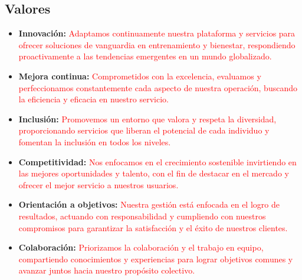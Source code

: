 \subsection{Valores}

\begin{itemize}
    \item \textbf{Innovación:} \textcolor{red}{Adaptamos continuamente nuestra plataforma y servicios para ofrecer soluciones de vanguardia en entrenamiento y bienestar, respondiendo proactivamente a las tendencias emergentes en un mundo globalizado.}
    \item \textbf{Mejora continua:} \textcolor{red}{Comprometidos con la excelencia, evaluamos y perfeccionamos constantemente cada aspecto de nuestra operación, buscando la eficiencia y eficacia en nuestro servicio.}
    \item \textbf{Inclusión:} \textcolor{red}{Promovemos un entorno que valora y respeta la diversidad, proporcionando servicios que liberan el potencial de cada individuo y fomentan la inclusión en todos los niveles.}
    \item \textbf{Competitividad:} \textcolor{red}{Nos enfocamos en el crecimiento sostenible invirtiendo en las mejores oportunidades y talento, con el fin de destacar en el mercado y ofrecer el mejor servicio a nuestros usuarios.}
    \item \textbf{Orientación a objetivos:} \textcolor{red}{Nuestra gestión está enfocada en el logro de resultados, actuando con responsabilidad y cumpliendo con nuestros compromisos para garantizar la satisfacción y el éxito de nuestros clientes.}
    \item \textbf{Colaboración:} \textcolor{red}{Priorizamos la colaboración y el trabajo en equipo, compartiendo conocimientos y experiencias para lograr objetivos comunes y avanzar juntos hacia nuestro propósito colectivo.}
\end{itemize}
